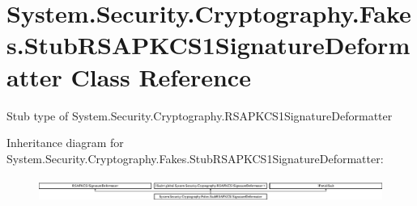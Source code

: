 \hypertarget{class_system_1_1_security_1_1_cryptography_1_1_fakes_1_1_stub_r_s_a_p_k_c_s1_signature_deformatter}{\section{System.\-Security.\-Cryptography.\-Fakes.\-Stub\-R\-S\-A\-P\-K\-C\-S1\-Signature\-Deformatter Class Reference}
\label{class_system_1_1_security_1_1_cryptography_1_1_fakes_1_1_stub_r_s_a_p_k_c_s1_signature_deformatter}
}


Stub type of System.\-Security.\-Cryptography.\-R\-S\-A\-P\-K\-C\-S1\-Signature\-Deformatter 


Inheritance diagram for System.\-Security.\-Cryptography.\-Fakes.\-Stub\-R\-S\-A\-P\-K\-C\-S1\-Signature\-Deformatter\-:\begin{figure}[H]
\begin{center}
\leavevmode
\includegraphics[height=0.790960cm]{class_system_1_1_security_1_1_cryptography_1_1_fakes_1_1_stub_r_s_a_p_k_c_s1_signature_deformatter}
\end{center}
\end{figure}
